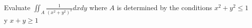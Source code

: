 Evaluate $\iint_A \frac{1}{\left(x^2+y^2\right)^2} d x d y$ where $A$ is determined by the conditions $x^2+y^2 \leq 1$ y $x+y \geq 1$
